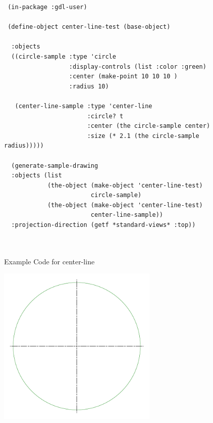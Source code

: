 \documentclass [11pt]{book}
\begin{document}
\begin{itemize}
\begin{description}
\end{description}




\begin{figure}
\begin{lrbox}{\boxedverb}
\begin{minipage}{\linewidth}
{\small

\begin{verbatim}
 (in-package :gdl-user)

 (define-object center-line-test (base-object)
 
  :objects 
  ((circle-sample :type 'circle
                  :display-controls (list :color :green)
                  :center (make-point 10 10 10 )
                  :radius 10)
   
   (center-line-sample :type 'center-line
                       :circle? t
                       :center (the circle-sample center)
                       :size (* 2.1 (the circle-sample radius)))))

  (generate-sample-drawing 
  :objects (list 
            (the-object (make-object 'center-line-test) 
                        circle-sample) 
            (the-object (make-object 'center-line-test) 
                        center-line-sample))
  :projection-direction (getf *standard-views* :top))
 
 
\end{verbatim}}
\end{minipage}
\end{lrbox}
\fbox{\usebox{\boxedverb}}

\caption{Example Code for center-line}

\label{fig:example-code-center-line}

\end{figure}

\begin{figure}
\begin{center}
\includegraphics[width=3in,height=3in]{../images/example-center-line.pdf}
\end{center}


\end{figure}
\end{itemize}
\end{document}
